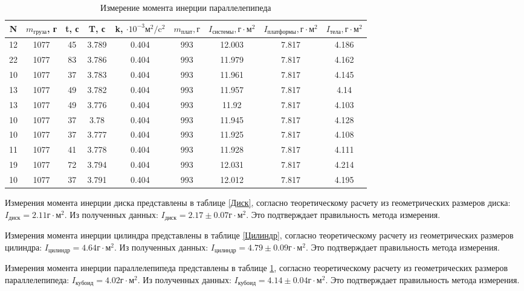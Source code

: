 \documentclass[a4paper,12pt]{article} %
\begin{document}
\begin{table} \label{Параллелепипед} \caption{Измерение момента инерции параллелепипеда} \begin{tabular}{|c|c|c|c|c|c|c|c|c|} \hline N & $m_\text{груза}$, г & t, с & T, с & k, $\cdot 10^{-3}\text{м}^2/\text{c}^2$ & $m_\text{плат}, г$ & $I_\text{системы}, \text{г}\cdot \text{м}^2$ &$I_\text{платформы}, \text{г}\cdot \text{м}^2$ & $I_\text{тела}, \text{г}\cdot \text{м}^2$ \\  \hline 12 & 1077 & 45 & 3.789 & 0.404 & 993 & 12.003 & 7.817 & 4.186 \\ \hline 22 & 1077 & 83 & 3.786 & 0.404 & 993 & 11.979 & 7.817 & 4.162 \\ \hline 10 & 1077 & 37 & 3.783 & 0.404 & 993 & 11.961 & 7.817 & 4.145 \\ \hline 13 & 1077 & 49 & 3.782 & 0.404 & 993 & 11.957 & 7.817 & 4.14 \\ \hline 13 & 1077 & 49 & 3.776 & 0.404 & 993 & 11.92 & 7.817 & 4.103 \\ \hline 10 & 1077 & 37 & 3.78 & 0.404 & 993 & 11.945 & 7.817 & 4.128 \\ \hline 10 & 1077 & 37 & 3.777 & 0.404 & 993 & 11.925 & 7.817 & 4.108 \\ \hline 11 & 1077 & 41 & 3.778 & 0.404 & 993 & 11.928 & 7.817 & 4.111 \\ \hline 19 & 1077 & 72 & 3.794 & 0.404 & 993 & 12.031 & 7.817 & 4.214 \\ \hline 10 & 1077 & 37 & 3.791 & 0.404 & 993 & 12.012 & 7.817 & 4.195 \\ \hline \end{tabular} \end{table}


Измерения момента инерции диска представлены в таблице \ref{Диск}, согласно теоретическому расчету из геометрических размеров диска: $I_\text{диск}=2.11 \text{г}\cdot \text{м}^2$. Из полученных данных: $I_\text{диск}=2.17 \pm 0.07 \text{г}\cdot \text{м}^2$. Это подтверждает правильность метода измерения.

Измерения момента инерции цилиндра представлены в таблице \ref{Цилиндр}, согласно теоретическому расчету из геометрических размеров цилиндра: $I_\text{цилиндр}=4.64 \text{г}\cdot \text{м}^2$. Из полученных данных: $I_\text{цилиндр}=4.79 \pm 0.09 \text{г}\cdot \text{м}^2$. Это подтверждает правильность метода измерения.

Измерения момента инерции параллелепипеда представлены в таблице \ref{Параллелепипед}, согласно теоретическому расчету из геометрических размеров параллелепипеда: $I_\text{кубоид}=4.02 \text{г}\cdot \text{м}^2$. Из полученных данных: $I_\text{кубоид}=4.14 \pm 0.04 \text{г}\cdot \text{м}^2$. Это подтверждает правильность метода измерения.
\end{document}
